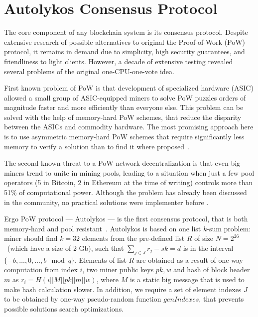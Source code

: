 \section{Autolykos Consensus Protocol}
\label{sec:autolykos}


The core component of any blockchain system is its consensus protocol.
Despite extensive research of possible alternatives to original the Proof-of-Work (PoW) protocol,
it remains in demand due to simplicity, high security guarantees, and friendliness to light clients.
However, a decade of extensive testing revealed several problems of the original one-CPU-one-vote idea.

First known problem of PoW is that development of specialized hardware (ASIC) allowed
a small group of ASIC-equipped miners to solve PoW puzzles orders of magnitude faster and more efficiently
than everyone else. This problem can be solved with the help of memory-hard PoW schemes,
that reduce the disparity between the ASICs and commodity hardware. The most promising approach here
is to use asymmetric memory-hard PoW schemes that require significantly less memory
to verify a solution than to find it where proposed~\cite{biryukov2017equihash,ethHash}.

The second known threat to a PoW network decentralization is that even big miners trend to unite in
mining pools, leading to a situation when just a few pool operators (5 in Bitcoin, 2 in Ethereum
at the time of writing) controls more than 51\% of computational power.
Although the problem has already been discussed in the community, no practical solutions were
implementer before \Ergo{}.


Ergo PoW protocol --- Autolykos --- is the first consensus protocol, that is both memory-hard
and pool resistant~\cite{Ergopow}.
Autolykos is based on one list $k$-sum problem: miner should find
$k=32$ elements from the pre-defined list $R$ of size $N=2^{26}$~(which have a size of 2 Gb),
such that $\sum_{j \in J} r_{j} - sk = d$ is in the interval $\{-b,\dots,0,\dots,b\mod q\}$.
Elements of list $R$ are obtained as a result of one-way computation from index $i$,
two miner public keys $pk,w$ and hash of block header $m$ as $r_i=H(i||M||pk||m||w)$,
where $M$ is a static big message that is used to make hash calculation slower.
In addition, we require a set of element indexes $J$ to be obtained
by one-way pseudo-random function $genIndexes$, that prevents possible solutions
search optimizations.

